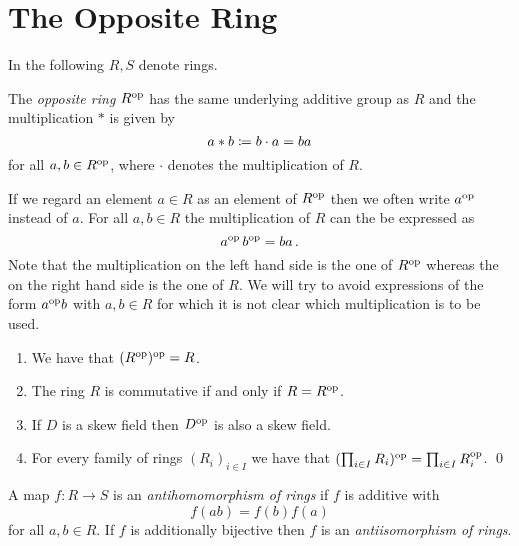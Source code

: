 \section{The Opposite Ring}
\label{appendix: the opposite ring}


\begin{conventions}
  In the following $R, S$ denote rings.
\end{conventions}


\begin{definition}
  The \emph{opposite ring} $R^{\operatorname{op}}$ has the same underlying additive group as $R$ and the multiplication $*$ is given by
  \[
              a * b
    \coloneqq  b \cdot a
    =         ba
  \]
  for all $a, b \in R^{\operatorname{op}}$, where $\cdot$ denotes the multiplication of $R$.
\end{definition}


\begin{notation}
  If we regard an element $a \in R$ as an element of $R^{\operatorname{op}}$ then we often write $a^{{\operatorname{op}}}$ instead of $a$.
  For all $a, b \in R$ the multiplication of $R$ can the be expressed as
  \[
      a^{\operatorname{op}} \, b^{\operatorname{op}}
    = b a \,.
  \]
  Note that the multiplication on the left hand side is the one of $R^{\operatorname{op}}$ whereas the on the right hand side is the one of $R$.
  We will try to avoid expressions of the form $a^{\operatorname{op}} b$ with $a, b \in R$ for which it is not clear which multiplication is to be used.
\end{notation}




\begin{lemma}
  \label{remark: basic properties of op}
  \leavevmode
  \begin{enumerate}
    \item
      We have that $( R^{\operatorname{op}} )^{\operatorname{op}} = R$.
    \item
      The ring $R$ is commutative if and only if $R = R^{\operatorname{op}}$.
    \item
      If $D$ is a skew field then $D^{\operatorname{op}}$ is also a skew field.
    \item
      For every family of rings $(R_i)_{i \in I}$ we have that $( \prod_{i \in I} R_i )^{\operatorname{op}} = \prod_{i \in I} R_i^{\operatorname{op}}$.
    \qed
  \end{enumerate}
\end{lemma}


\begin{definition}
  A map $f \colon R \to S$ is an \emph{antihomomorphism of rings} if $f$ is additive with
  \[
    f(a b) = f(b) f(a)
  \]
  for all $a, b \in R$.
  If $f$ is additionally bijective then $f$ is an \emph{antiisomorphism of rings}.
\end{definition}


